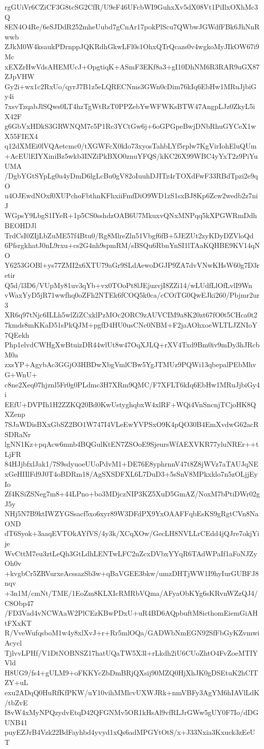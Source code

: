 rgGUiVr6CZiCF3G8tcSG2CfR/U9eF46UFcbWI9GuhxXv5dX08Vt1PiIlxOXhMc3Q
8EN4O4Re/6eSJDdR252mheUubd7gCnAr17pokPlScu7QWbwJGWdfFBk6JhNnRwwb
ZJkM0W4ksaukPDrnppJQKRdhGkwLFl0s1OhxQTrQcazs0v4wgkoMyJIkOW67i9Mc
xEXZrHwVdsAHEMUcJ+OpgtiqK+ASmF3EKf8a3+gI10DhNM6R3RAR9uGX87ZJpVHW
Gy2i+wx1c2RxUo/qyrJ7B1z5eLQRECNms3GWn0cDim76kIq6EbHw1MRuJjbiGy4i
7xsvTzqabJlSQws0LT4hzTgWtRzT0PPZebYwWFWKsBTW47AngpLJz0ZkyL5iX42F
g6GbVxHDkS3GRWNQM7c5P1Rc3YCtGw6j+6oGPGpeBwjDNbRhuGYCeX1wX55FIEX4
q12dXMEi0lVQAetcmc0/tXGWFcX0kIo73xyosTahbLYf5rplw7KgVirIohEluQUm
+AcEUlEIYXiniBz5wkb3INZiPkBXO0znuYFQS/kKC26X99WBC4yYxT2z9PiYuUMA
/DgbYGtSYpLg0u4yDmD6lgLcBu0gV82oIuuhDJITz4rTOXdFwF33RBdTpzi2e9qO
u4OJEwdNOxf0XUPchoFbthnKFhxiiFmfDiO9WD1zS1sxBJ8Kp6Zcw2wedb2z7niJ
WGpsY9LbgS1IYeR+1p5CS0sshdzOAB6U7MkuxvQNxMNPqq5kXPGWRmDdhBEOHDJl
TrdCsI0ZIjLbZuME57f4Btu0/Rg8MlreZln51Vbgf6fB+5JEZUt2zyKDyDZVloQd
6PfsrgkhatJ0nL9rxu+cs2G4nh9spmRM/sBSQu6RbnYnSI1lTAaKQHBE9KV14qNO
Y6253GOBl+ys77ZMI2x6XTU79aGr9SLdAewoDGJP9ZA7dvVNwKHsW60g7D3retir
Q5d/l3D6/VUpMy81uv3qYb+vx0TOoPt8lJEjuzvjI8ZZi14/wLUdfLlOfLvlI9Wn
vWaxYyD5jR71wwfhq0oZFh2NTEk6fCOQ5k0ca/cCOiTG0QwEJki260/Pbjmr2ur3
XR6q97tNjc6ILLh5wlZiZCxklPzMOc2ORC9zAUVCIM9a8K20zt67fO0t5CHca0t2
7kmds8mKKaD51sPkQJM+pgfD4HU0usCNc0NBM+F2jaAOhxoeWLTLJZNIoY7QEekh
Php1elvdCWHgXwBtuizDR44wlUt8w47OqXJLQ+rXV4Txd9Bm0iv9mDy3hJRcbM0a
zxsYP+AgybAc3GGjO3HBDwXbgVmlCBw5YgJTMUz9PQWi13qbepalPEbMhvG+WnU+
c8ne2Xeq07hjznl5Fr0g0PLdmc3H7XRm9QMC/F7XFLT6kIq6EbHw1MRuJjbiGy4i
EEfU+DVPIh1H2ZZKQ20Bd0KwUstyghqbxW4xlRF+WQi4VnSncnjTCjoHK8QXZenp
7SJaWDisBXxGbSZ2BO1W747I4VLeEwYVPSxO9K4pQO30B4EmXvdwG62acRSDRaNr
lgNN1Kz+pqAcw6mnb4BQGulKtEN7ZSOoE9SjeursWfAEXVKR77yluNREr++tLjFR
84HJjbfxlJak1/7S9sdyuoeUUoPdvM1+DE76E8yphrnnV47t8Z8jWVz7aTAUJqNE
xGeHIIlFd9J0T4oBDRm18/AgSXSDFXL6L7DuD3+5sSnV8MPkxklo7n5zOLjjEyIo
Zf4KSiZSNeg7m8+44LPno+bo3MDjczNIP3KZ5XuD5GmAZ/NoxM7bPtiDWr02gJ5y
NHj5N7B9ktIWZYGSsacf5xo6xyr89W3DFdPX9YxOAAFFqbEsKS9gRgtCVn8NaOND
dT6Syok+3aaqEVTOkAYfVS/4y3k/XCqXOw/GecLH8NVLLrCEdd4jQJre7okjYije
WvCttM7eu3ztLeQh3GtLdhLENTwLFC2nZcxDVbxYYqR6TAdWPaIf1aFoNJZyOh0v
+kvgbCr5ZRVurxeAcssazSb3w+qBaVGEE3bkw/umzDHTjWW1I9hyIurGUBFJ8nqv
+3n1M/cmNt/TME/1EoZm8KLXIcRMRbVQma/AFyaObKYg6sKRvnWZzQJ4/C8Obp47
/FD3Vad4vNCWAaW2PlCEzKBwPDxU+uR4BD6AQpbuftM8icthomEiemGiAHtFXxKT
R/VveWufqsboM1w4y8xlXvJ+r+Rr5mlOQa/GADWbNmEGN92SfFbGyKZvmwiAcycl
TjlvvLPHf/V1DtNOBNSZ17hatUQaTW5X3l+rLkdh2iU6CUoZhtO4FvZoeMTIYVld
H8UG9/fs4+gULM9+oFKKYcZbDmBRjQXsij90MZQ0HjXhJK0gDSEtuK2hCITZY+uL
exu2ADqQ0HuRfKfPKW/uY10vihMMlcvUXWJRk+nmVBFy3AgYM6hIAVlLdK/tbZvE
I8vW4xMyNPQzydvEtqD42QFGNMv5OR1kHsAl9vfRLJrGWw5gUY0F7Io/dDGUNB41
puyEZJrB4Vzk22BdFayhbd4yvyd1xQs6adMPGYtOtS/x+J33Nxia3Kxuck3zEeUT
